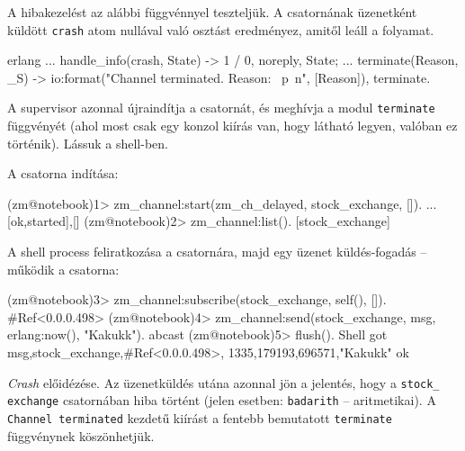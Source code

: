 \documentclass[12pt, a4paper, oneside]{book}
\begin{document}
A hibakezelést az alábbi függvénnyel teszteljük. A csatornának üzenetként
küldött \texttt{crash} atom nullával való osztást eredményez, amitől leáll a
folyamat.

\begin{code}{erlang}{}
...
handle_info(crash, State) ->
  1 / 0, 
  {noreply, State};
...
terminate(Reason, _S) ->
  io:format("Channel terminated. Reason: ~p~n", [Reason]),
  terminate.
\end{code}

A supervisor azonnal újraindítja a csatornát, és meghívja a modul
\texttt{terminate} függvényét (ahol most csak egy konzol kiírás van, hogy
látható legyen, valóban ez történik). Lássuk a shell-ben.

A csatorna indítása:
\begin{code}{}{}
(zm@notebook)1> zm_channel:start(zm_ch_delayed, 
                                 stock_exchange, []).
...
{[{ok,started}],[]}
(zm@notebook)2> zm_channel:list().
[stock_exchange]
\end{code}

A shell process feliratkozása a csatornára, majd egy üzenet küldés-fogadás --
működik a csatorna:

\begin{code}{}{}
(zm@notebook)3> zm_channel:subscribe(stock_exchange, 
                                     self(), []).   
#Ref<0.0.0.498>
(zm@notebook)4> zm_channel:send(stock_exchange, 
                   {msg, {erlang:now(), "Kakukk"}}).
abcast
(zm@notebook)5> flush().                                                         
Shell got {msg,{stock_exchange,#Ref<0.0.0.498>},
               {{1335,179193,696571},"Kakukk"}}
ok
\end{code}

\emph{Crash} előidézése. Az üzenetküldés utána azonnal jön a jelentés, hogy a
\texttt{stock\_ exchange} csatornában hiba történt (jelen esetben:
\texttt{badarith} -- aritmetikai). A \texttt{Channel terminated}
kezdetű kiírást a fentebb bemutatott \texttt{terminate} függvénynek
köszönhetjük.
\end{document}
